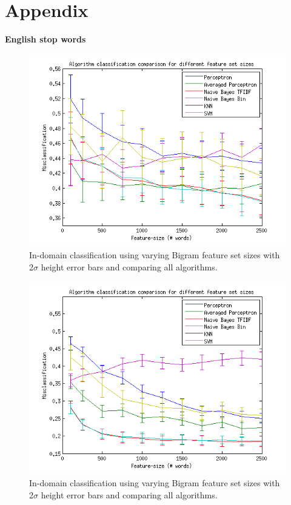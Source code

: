 \chapter{Appendix}
\textbf{English stop words} \\

\begin{figure}[H]
\centering
\includegraphics[scale = 0.5]{../Plottar/feature-size100-2500bigram.png}
\caption{In-domain classification using varying Bigram feature set sizes with 2$\sigma$ height error bars and comparing all algorithms.}
\label{fig:trainingsize}
\end{figure} 

\begin{figure}[H]
\centering
\includegraphics[scale = 0.5]{../Plottar/feature-size100-2500all.png}
\caption{In-domain classification using varying Bigram feature set sizes with 2$\sigma$ height error bars and comparing all algorithms.}
\label{fig:trainingsize}
\end{figure} 

